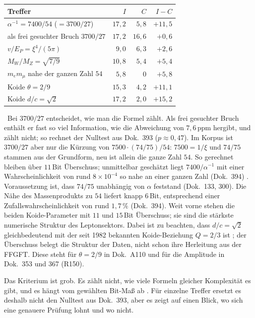 \begin{center}
\begin{tabular}{@{}lrrr@{}}
\toprule
\textbf{Treffer} & \textbf{$I$} & \textbf{$C$} & \textbf{$I-C$}\\
\midrule
$\alpha^{-1}=7400/54$ ($=3700/27$) & $17{,}2$ & $5{,}8$ & $+11{,}5$\\
\quad als frei gesuchter Bruch $3700/27$ & $17{,}2$ & $16{,}6$ & $+0{,}6$\\
$v/E_P=\xi^4/(5\pi)$ & $9{,}0$ & $6{,}3$ & $+2{,}6$\\
$M_W/M_Z=\sqrt{7/9}$ & $10{,}8$ & $5{,}4$ & $+5{,}4$\\
$m_em_\mu$ nahe der ganzen Zahl $54$ & $5{,}8$ & $0$ & $+5{,}8$\\
Koide $\theta=2/9$ & $15{,}3$ & $4{,}2$ & $+11{,}1$\\
Koide $d/c=\sqrt2$ & $17{,}2$ & $2{,}0$ & $+15{,}2$\\
\bottomrule
\end{tabular}
\end{center}
\KM\ Bei $3700/27$ entscheidet, wie man die Formel zählt. Als frei gesuchter Bruch enthält er fast so
viel Information, wie die Abweichung von $7{,}6$\,ppm hergibt, und zählt nicht; so rechnet der
Nulltest aus Dok.~393 ($p\approx0{,}47$). Im Korpus ist $3700/27$ aber nur die Kürzung von
$7500\cdot(74/75)/54$: $7500=1/\xi$ und $74/75$ stammen aus der Grundform, neu ist allein die ganze
Zahl $54$. So gerechnet bleiben über $11$\,Bit Überschuss; unmittelbar geschätzt liegt
$7400/\alpha^{-1}$ mit einer Wahrscheinlichkeit von rund $8\times10^{-4}$ so nahe an einer ganzen Zahl
(Dok.~394) \KM. Voraussetzung ist, dass $74/75$ unabhängig von $\alpha$ feststand (Dok.~133, 300). Die Nähe des
Massenprodukts zu $54$ liefert knapp $6$\,Bit, entsprechend einer Zufallswahrscheinlichkeit von rund
$1{,}7\,\%$ (Dok.~394). Weit vorne stehen die beiden Koide-Parameter mit $11$ und $15$\,Bit Überschuss;
sie sind die stärkste numerische Struktur des Leptonsektors. Dabei ist zu beachten, dass $d/c=\sqrt2$
gleichbedeutend mit der seit 1982 bekannten Koide-Beziehung $Q=2/3$ ist \cite{Koide1982}; der Überschuss
belegt die Struktur der Daten, nicht schon ihre Herleitung aus der FFGFT. Diese steht für $\theta=2/9$
in Dok.~A110 und für die Amplitude in Dok.~353 und 367 (R150).

Das Kriterium ist grob. Es zählt nicht, wie viele Formeln gleicher Komplexität es gibt, und es hängt
vom gewählten Bit-Maß ab \SM. Für einzelne Treffer ersetzt es deshalb nicht den Nulltest aus
Dok.~393, aber es zeigt auf einen Blick, wo sich eine genauere Prüfung lohnt und wo nicht.

